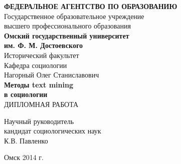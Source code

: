 \begin{titlepage}

\begin{center}
{\bf ФЕДЕРАЛЬНОЕ АГЕНТСТВО ПО ОБРАЗОВАНИЮ}\\
\vspace{0.5cm}
Государственное образовательное учреждение\\
высшего профессионального образования\\
\textbf{Омский государственный университет\\
им. Ф. М. Достоевского\\}
\vspace{0.5cm}
Исторический факультет\\
Кафедра социологии\\
\vspace{3cm}
Нагорный Олег Станиславович\\
\vspace{1cm}
\textbf{\large Методы text mining\\в социологии\\}
\vspace{2cm}
ДИПЛОМНАЯ РАБОТА\\

\vspace{4cm}
\end{center}

\begin{flushright}
Научный руководитель\\
кандидат социологических наук\\
К.В. Павленко\\
                                               
\vspace{4cm}

\begin{center}
Омск 2014 г.
\end{center}

\end{flushright}
\end{titlepage}